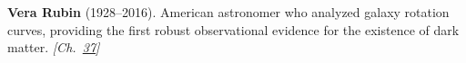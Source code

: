 \textbf{Vera Rubin} (1928–2016). American astronomer who analyzed galaxy rotation curves, providing the first robust observational evidence for the existence of dark matter. \emph{[Ch.~\hyperref[ch:darkmatterevidence]{37}]}

